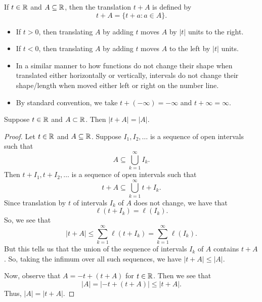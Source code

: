 \documentclass[11pt,a4paper]{book}
\begin{document}
\begin{definition}[Translation; \( t + A  \)]
   If \( t \in \mathbb{R}  \) and \( A \subseteq  \mathbb{R}  \), then the translation \( t + A  \) is defined by 
   \[  t + A = \{ t + a : a \in A  \}. \]
\end{definition}

\begin{itemize}
    \item If \( t > 0  \), then translating \( A  \) by adding \( t  \) moves \(  A \) by \( | t |   \) units to the right.
    \item If \( t < 0  \), then translating \(A  \) by adding \( t  \) moves \( A  \) to the left by \( | t |   \) units.
    \item In a similar manner to how functions do not change their shape when translated either horizontally or vertically, intervals do not change their shape/length when moved either left or right on the number line. 
    \item By standard convention, we take \( t + (-\infty ) = - \infty  \) and \( t + \infty  = \infty  \).
\end{itemize} 

\begin{prop}
   Suppose \( t \in \mathbb{R}  \) and \( A \subset \mathbb{R}  \). Then \( | t + A  |  = | A  |  \). 
\end{prop}

\begin{proof}
Let \( t \in \mathbb{R}  \) and \( A \subseteq  \mathbb{R}  \). Suppose \( {I}_{1}, {I}_{2}, \dots  \) is a sequence of open intervals such that 
\[  A \subseteq  \bigcup_{ k=1  }^{ \infty  }  {I}_{k}. \]
Then \( t + {I}_{1}, t + {I}_{2}, \dots  \) is a sequence of open intervals such that
\[  t + A \subseteq  \bigcup_{ k=1  }^{ \infty  }  t + {I}_{k}. \]
Since translation by \( t  \) of intervals \( {I}_{k} \) of \( A  \) does not change, we have that
\[  \ell(t + {I}_{k}) = \ell({I}_{k}). \]
So, we see that
\[  | t + A  |  \leq \sum_{ k=1  }^{ \infty   } \ell(t + {I}_{k }) = \sum_{ k=1  }^{ \infty   } \ell({I}_{k}). \]
But this tells us that the union of the sequence of intervals \( {I}_{k} \) of \( A  \) contains \( t + A  \). So, taking the infimum over all such sequences, we have \(  | t +A  | \leq | A  |   \).

Now, observe that \( A = -t + (t + A) \) for \( t \in \mathbb{R}  \). Then we see that
\[  | A  |  = | -t + (t +A )  | \leq| t + A  |.  \]
Thus, \( | A  |  = | t + A  |  \).
\end{proof}
\end{document}
